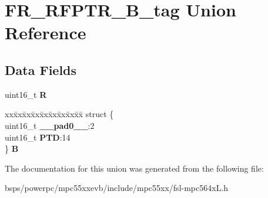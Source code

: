 \hypertarget{unionFR__RFPTR__16B__tag}{}\section{F\+R\+\_\+\+R\+F\+P\+T\+R\+\_\+B\+\_\+tag Union Reference}
\label{unionFR__RFPTR__16B__tag}
\subsection*{Data Fields}
\begin{DoxyCompactItemize}
\item 
\mbox{\label{unionFR__RFPTR__16B__tag_a133c5259d981ee42634af3da0e2f0f63}} 
uint16\+\_\+t {\bfseries R}
\item 
\mbox{\label{unionFR__RFPTR__16B__tag_aa962b54ba5b61e0e5f85bd80416e5836}} 
\begin{tabbing}
xx\=xx\=xx\=xx\=xx\=xx\=xx\=xx\=xx\=\kill
struct \{\\
\>uint16\_t {\bfseries \_\_pad0\_\_}:2\\
\>uint16\_t {\bfseries PTD}:14\\
\} {\bfseries B}\\

\end{tabbing}\end{DoxyCompactItemize}


The documentation for this union was generated from the following file\+:\begin{DoxyCompactItemize}
\item 
bsps/powerpc/mpc55xxevb/include/mpc55xx/fsl-\/mpc564x\+L.\+h\end{DoxyCompactItemize}
